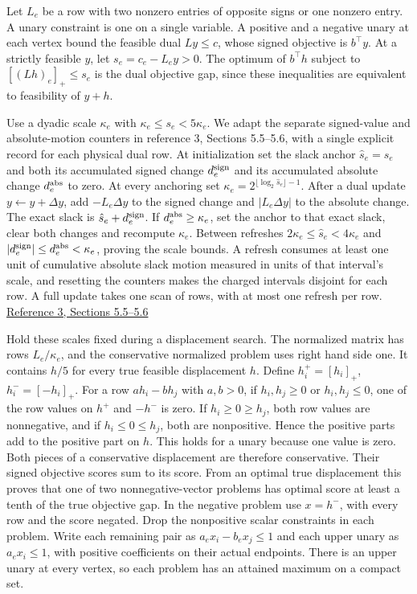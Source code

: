 \documentclass[11pt]{article}
\begin{document}
Let \(L_e\) be a row with two nonzero entries of opposite signs or one nonzero entry. A unary constraint is one on a single variable. A positive and a negative unary at each vertex bound the feasible dual \(Ly\le c\), whose signed objective is \(b^\top y\). At a strictly feasible \(y\), let \(s_e=c_e-L_ey>0\). The optimum of \(b^\top h\) subject to \([(Lh)_e]_+\le s_e\) is the dual objective gap, since these inequalities are equivalent to feasibility of \(y+h\).

Use a dyadic scale \(\kappa_e\) with \(\kappa_e\le s_e<5\kappa_e\). We adapt the separate signed-value and absolute-motion counters in reference 3, Sections 5.5--5.6, with a single explicit record for each physical dual row. At initialization set the slack anchor \(\hat s_e=s_e\) and both its accumulated signed change \(d_e^{\rm sign}\) and its accumulated absolute change \(d_e^{\rm abs}\) to zero. At every anchoring set \(\kappa_e=2^{\lfloor\log_2\hat s_e\rfloor-1}\). After a dual update \(y\leftarrow y+\Delta y\), add \(-L_e\Delta y\) to the signed change and \(|L_e\Delta y|\) to the absolute change. The exact slack is \(\hat s_e+d_e^{\rm sign}\). If \(d_e^{\rm abs}\ge\kappa_e\), set the anchor to that exact slack, clear both changes and recompute \(\kappa_e\). Between refreshes \(2\kappa_e\le\hat s_e<4\kappa_e\) and \(|d_e^{\rm sign}|\le d_e^{\rm abs}<\kappa_e\), proving the scale bounds. A refresh consumes at least one unit of cumulative absolute slack motion measured in units of that interval's scale, and resetting the counters makes the charged intervals disjoint for each row. A full update takes one scan of rows, with at most one refresh per row. \href{https://github.com/openai/math/blob/main/preprints/Almost-Linear-Time-Maximum-Cardinality-Matching-in-Sparse-General-Graphs-September-24-2026/main.pdf}{Reference 3, Sections 5.5--5.6}

Hold these scales fixed during a displacement search. The normalized matrix has rows \(L_e/\kappa_e\), and the conservative normalized problem uses right hand side one. It contains \(h/5\) for every true feasible displacement \(h\). Define \(h_i^+=[h_i]_+\), \(h_i^-=[-h_i]_+\). For a row \(a h_i-b h_j\) with \(a,b>0\), if \(h_i,h_j\ge0\) or \(h_i,h_j\le0\), one of the row values on \(h^+\) and \(-h^-\) is zero. If \(h_i\ge0\ge h_j\), both row values are nonnegative, and if \(h_i\le0\le h_j\), both are nonpositive. Hence the positive parts add to the positive part on \(h\). This holds for a unary because one value is zero. Both pieces of a conservative displacement are therefore conservative. Their signed objective scores sum to its score. From an optimal true displacement this proves that one of two nonnegative-vector problems has optimal score at least a tenth of the true objective gap. In the negative problem use \(x=h^-\), with every row and the score negated. Drop the nonpositive scalar constraints in each problem. Write each remaining pair as \(a_e x_i-b_e x_j\le1\) and each upper unary as \(a_e x_i\le1\), with positive coefficients on their actual endpoints. There is an upper unary at every vertex, so each problem has an attained maximum on a compact set.
\end{document}
